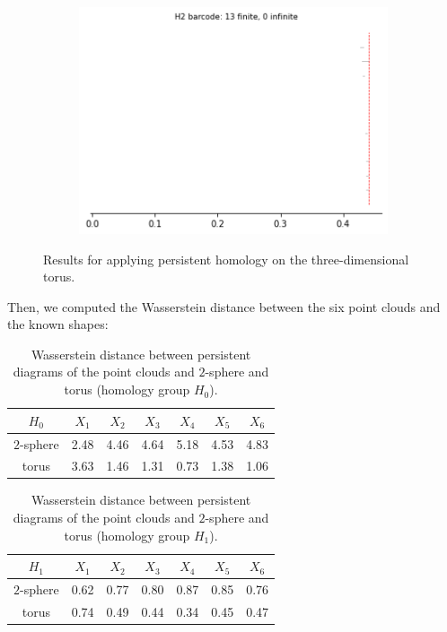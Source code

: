 \begin{figure}[H]
\begin{subfigure}[b]{0.24\textwidth}
\includegraphics[width=\textwidth]{figures/topology/torus_H2_barcode.png}
 \caption{}
\end{subfigure}
\caption{Results for applying persistent homology on the three-dimensional torus.}
\end{figure}

Then, we computed the Wasserstein distance between the six point clouds and the known shapes:

\begin{table}[!htbp]
        \centering
        \small
        \setlength\tabcolsep{5pt}
        \begin{tabular}{|c|c|c|c|c|c|c|}
\hline
  $H_0$& $X_1$ & $X_2$ & $X_3$ & $X_4$ & $X_5$ & $X_6$ \\ \hline
$2$-sphere & 2.48 & 4.46&  4.64 & 5.18 & 4.53 & 4.83\\\hline
torus & 3.63 &  1.46 & 1.31 & 0.73 & 1.38 & 1.06 \\ \hline
\end{tabular}
\caption{Wasserstein distance between persistent diagrams of the point clouds and $2$-sphere and torus (homology group $H_0$).}
\label{tab:sphere-H0}
\end{table}


\begin{table}[!htbp]
        \centering
        \small
        \setlength\tabcolsep{5pt}
        \begin{tabular}{|c|c|c|c|c|c|c|}
\hline
$H_1$& $X_1$ & $X_2$ & $X_3$ & $X_4$ & $X_5$ & $X_6$ \\ \hline
$2$-sphere & 0.62 &   0.77 & 0.80 & 0.87 & 0.85 & 0.76\\\hline
torus & 0.74 & 0.49 & 0.44 & 0.34 & 0.45 & 0.47\\ \hline
\end{tabular}
\caption{Wasserstein distance between persistent diagrams of the point clouds and $2$-sphere and torus (homology group $H_1$).}
\label{tab:sphere-H1}
\end{table}

